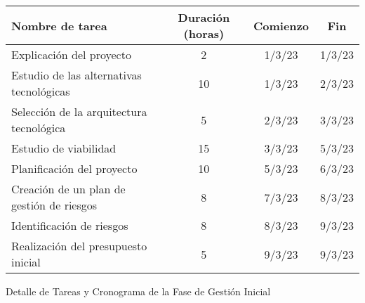 \begin{planificacion}
	\centering
	\begin{tabular}{ | m{9cm} | c | c | c |}
		\hline
		\textbf{Nombre de tarea}                  & \textbf{Duración (horas)} & \textbf{Comienzo} & \textbf{Fin} \\
		\hline
		Explicación del proyecto                  & 2                         & 1/3/23            & 1/3/23       \\
		\hline
		Estudio de las alternativas tecnológicas  & 10                        & 1/3/23            & 2/3/23       \\
		\hline
		Selección de la arquitectura tecnológica  & 5                         & 2/3/23            & 3/3/23       \\
		\hline
		Estudio de viabilidad                     & 15                        & 3/3/23            & 5/3/23       \\
		\hline
		Planificación del proyecto                & 10                        & 5/3/23            & 6/3/23       \\
		\hline
		Creación de un plan de gestión de riesgos & 8                         & 7/3/23            & 8/3/23       \\
		\hline
		Identificación de riesgos                 & 8                         & 8/3/23            & 9/3/23       \\
		\hline
		Realización del presupuesto inicial       & 5                         & 9/3/23            & 9/3/23       \\
		\hline
	\end{tabular}
	\caption{Detalle de Tareas y Cronograma de la Fase de Gestión Inicial}
\end{planificacion}
